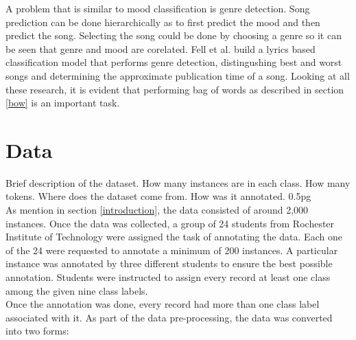 \documentclass[11pt,a4paper]{article}
\begin{document}
A problem that is similar to mood classification is genre detection. Song prediction can be done hierarchically as to first predict the mood and then predict the song. Selecting the song could be done by choosing a genre so it can be seen that genre and mood are corelated. Fell et al. \cite{fell2014lyrics} build a lyrics based classification model that performs genre detection, distingushing best and worst songs and determining the approximate publication time of a song. Looking at all these research, it is evident that performing bag of words as described in section \ref{bow} is an important task.

\section{Data}
\label{data}
Brief description of the dataset. How many instances are in each class. How many tokens. Where does the dataset come from. How was it annotated. 0.5pg\\
As mention in section \ref{introduction}, the data consisted of around 2,000 instances. Once the data was collected, a group of 24 students from Rochester Institute of Technology were assigned the task of annotating the data. Each one of the 24 were requested to annotate a minimum of 200 instances. A particular instance was annotated by three different students to ensure the best possible annotation. Students were instructed to assign every record at least one class among the given nine class labels.\\ 
Once the annotation was done, every record had more than one class label associated with it. As part of the data pre-processing, the data was converted into two forms:
\end{document}
